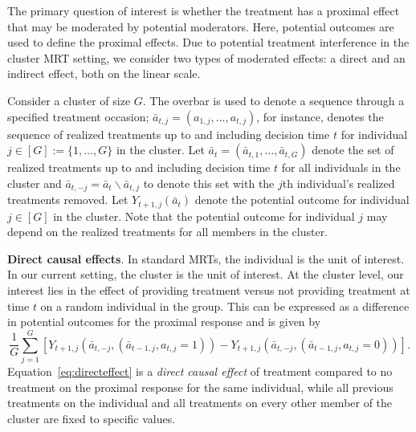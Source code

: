 \documentclass[12pt]{article}
\newcommand{\zw}[1]{\textcolor{blue}{[\textit{ZW: #1}]}}
\begin{document}
The primary question of interest is whether the treatment has a proximal effect that may be moderated by potential moderators. Here, potential outcomes are used to define the proximal effects. Due to potential treatment interference in the cluster MRT setting, we consider two types of moderated effects: a direct and an indirect effect, both on the linear scale.

Consider a cluster of size $G$.  The overbar is used to denote a sequence through a specified treatment occasion; $\bar a_{t,j} = (a_{1,j},\ldots, a_{t,j})$, for instance, denotes the sequence of realized treatments up to and including decision time $t$ for individual $j \in [G]:=\{1,\ldots, G\}$ in the cluster.   Let $\bar a_{t} = (\bar a_{t,1}, \ldots, \bar a_{t,G})$ denote the set of realized treatments up to and including decision time $t$ for all individuals in the cluster and $\bar a_{t,-j} = \bar a_t \backslash \bar a_{t,j}$ to denote this set with the $j$th individual's realized treatments removed. Let $Y_{t+1,j} (\bar a_{t})$ denote the potential outcome for individual $j \in [G]$ in the cluster.  Note that the potential outcome for individual $j$ may depend on the realized treatments for all members in the cluster.

\noindent \textbf{Direct causal effects}.
In standard MRTs, the individual is the unit of interest.  In our current setting, the cluster is the unit of interest.  At the cluster level, our interest lies in the effect of providing treatment versus not providing treatment at time $t$ on a random individual in the group.  This can be expressed as a difference in potential outcomes for the proximal response and is given by
\begin{equation}
\label{eq:directeffect}
\frac{1}{G} \sum_{j=1}^G \left[ Y_{t+1,j} (\bar a_{t,-j}, (\bar a_{t-1,j}, a_{t,j}=1)) - Y_{t+1,j} (\bar a_{t,-j}, (\bar a_{t-1,j}, a_{t,j}=0)) \right].
\end{equation}
Equation~\eqref{eq:directeffect} is a \emph{direct causal effect} of treatment compared to no treatment on the proximal response for the same individual, while all previous treatments on the individual and all treatments on every other member of the cluster are fixed to specific values.
\end{document}
